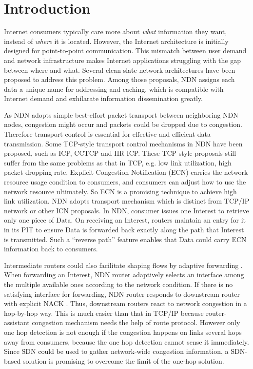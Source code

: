 
\section{Introduction}

Internet consumers typically care more about \emph{what} information they want, instead of \emph{where} it is located. However, the Internet architecture is initially designed for point-to-point communication. This mismatch between user demand and network infrastructure makes Internet applications struggling with the gap between where and what. Several clean slate network architectures have been proposed to address this problem. Among those proposals, NDN\cite{NDN} assigns each data a unique name for addressing and caching, which is compatible with Internet demand and exhilarate information dissemination greatly.


As NDN adopts simple best-effort packet transport between neighboring NDN nodes, congestion might occur and packets could be dropped due to congestion. Therefore transport control is essential for effective and efficient data transmission. Some TCP-style transport control mechanisms in NDN have been proposed, such as ICP\cite{ICP}, CCTCP\cite{CCTCP} and HR-ICP\cite{shape}. These TCP-style proposals still suffer from the same problems as that in TCP, e.g. low link utilization, high packet dropping rate. Explicit Congestion Notification (ECN) carries the network resource usage condition to consumers, and consumers can adjust how to use the network resource ultimately\cite{XCP}. So ECN is a promising technique to achieve high link utilization. NDN adopts transport mechanism \cite{NDN, Adaptive} which is distinct from TCP/IP network or other ICN proposals. In NDN, consumer issues one Interest to retrieve only one piece of Data. On receiving an Interest, routers maintain an entry for it in its PIT to ensure Data is forwarded back exactly along the path that Interest is transmitted. Such a ``reverse path'' feature enables that Data could carry ECN information back to consumers.

Intermediate routers could also facilitate shaping flows by adaptive forwarding \cite{Adaptive}. When forwarding an Interest, NDN router adaptively selects an interface among the multiple available ones according to the network condition. If there is no satisfying interface for forwarding, NDN router responds to downstream router with explicit NACK \cite{Adaptive}. Thus, downstream routers react to network congestion in a hop-by-hop way. This is much easier than that in TCP/IP because router-assistant congestion mechanism needs the help of route protocol\cite{selfish}. However only one hop detection is not enough if the congestion happens on links several hops away from consumers, because the one hop detection cannot sense it immediately. Since SDN\cite{SDN} could be used to gather network-wide congestion information, a SDN-based solution is promising to overcome the limit of the one-hop solution.


